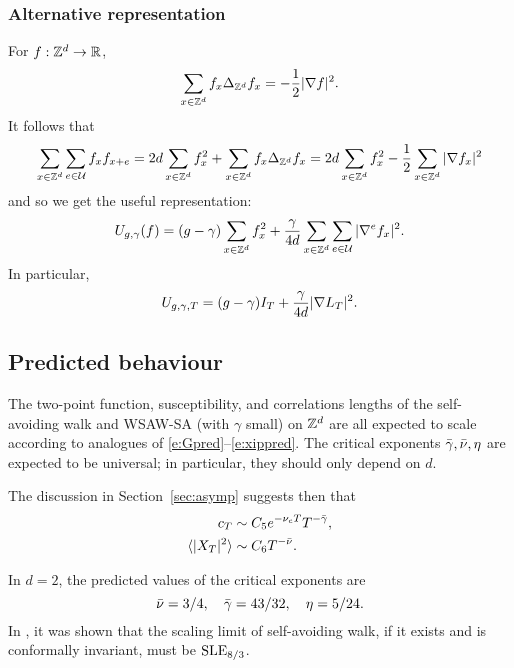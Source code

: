 \subsubsection{Alternative representation}

For $f : { {{\mathbb Z}}^d } \rightarrow {\mathbb R}$,
\begin{equation}
\label{e:sbp}
\sum_{x\in{ {{\mathbb Z}}^d }}   f_x \Delta_{{ {{\mathbb Z}}^d }} f_x
=
-\frac{1}{2} |\nabla f|^2.
\end{equation}
It follows that
\begin{equation}
\sum_{x\in{ {{\mathbb Z}}^d }} \sum_{e\in\mathcal{U}} f_x f_{x+e}
=
2 d \sum_{x\in{ {{\mathbb Z}}^d }} f_x^2
+ \sum_{x\in{ {{\mathbb Z}}^d }} f_x \Delta_{{ {{\mathbb Z}}^d }} f_x
=
2 d \sum_{x\in{ {{\mathbb Z}}^d }} f_x^2
- \frac{1}{2} \sum_{x\in{ {{\mathbb Z}}^d }} |\nabla f_x|^2
\end{equation}
and so we get the useful representation:
\begin{equation}
\label{e:Udef-pos}
U_{g,\gamma}(f)
= (g - \gamma) \sum_{x\in{ {{\mathbb Z}}^d }} f_x^2
+ \frac{\gamma}{4d} \sum_{x\in{ {{\mathbb Z}}^d }} \sum_{e\in\mathcal{U}} |\nabla^e f_x|^2.
\end{equation}
In particular,
\begin{equation}
  \label{e:V2}
  U_{g,\gamma,T} =
  (g - \gamma) I_T
  + \frac{\gamma}{4d}
  |\nabla L_T|^2
  .
\end{equation}


\subsection{Predicted behaviour}


The two-point function, susceptibility, and correlations lengths of the
self-avoiding walk and WSAW-SA (with $\gamma$ small) on ${ {{\mathbb Z}}^d }$ are all expected
to scale according to analogues of \eqref{e:Gpred}--\eqref{e:xippred}. The
critical exponents $\bar\gamma, \bar\nu, \eta$ are expected to be universal; in
particular, they should only depend on $d$.

The discussion in Section~\ref{sec:asymp} suggests then that
\begin{align}
c_T                       &\sim C_5 e^{-\nu_c T} T^{-\bar\gamma}, \\
\langle |X_T|^2 \rangle   &\sim C_6 T^{-\bar\nu}.
\end{align}

In $d = 2$, the predicted values of the critical exponents are
\begin{equation}
\bar\nu = 3/4, \quad \bar\gamma = 43/32, \quad \eta = 5/24.
\end{equation}
In \cite{LSW04}, it was shown that the scaling limit of self-avoiding walk,
if it exists and is conformally invariant, must be ${\rm SLE}_{8/3}$.


